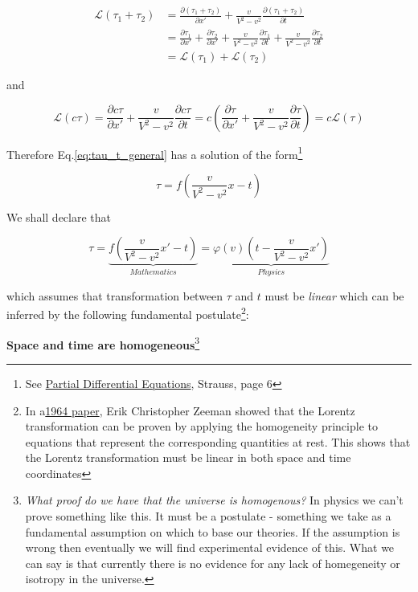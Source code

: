 \begin{align}
    \mathscr{L}(\tau_1 + \tau_2) &= \frac{\partial(\tau_1 + \tau_2)}{\partial x'} + \frac{v}{V^2 - v^2}\frac{\partial(\tau_1 + \tau_2)}{\partial t} \\
    &= \frac{\partial\tau_1}{\partial x'} + \frac{\partial\tau_2}{\partial x'} + \frac{v}{V^2 - v^2}\frac{\partial\tau_1}{\partial t} + \frac{v}{V^2 - v^2}\frac{\partial\tau_2}{\partial t} \\
    &= \mathscr{L}(\tau_1) + \mathscr{L}(\tau_2)
\end{align}

and

\begin{equation}
    \mathscr{L}(c\tau) = \frac{\partial c\tau}{\partial x'} + \frac{v}{V^2 - v^2}\frac{\partial c\tau}{\partial t} = c\left( \frac{\partial\tau}{\partial x'} + \frac{v}{V^2 - v^2}\frac{\partial\tau}{\partial t} \right) = c\mathscr{L}(\tau)
\end{equation}

Therefore Eq.\ref{eq:tau_t_general} has a solution of the form\footnote{See \href{https://trello.com/c/5L46ePJQ}{Partial Differential Equations}, Strauss, page 6}

\begin{equation}
    \tau = f\left( \frac{v}{V^2 - v^2} x - t \right)
\end{equation}

We shall declare that

\begin{equation}\label{eq:transformation}
\tau = \underbrace{f\left( \frac{v}{V^2 - v^2} x' - t \right)}_{Mathematics} = \underbrace{\varphi(v)\left( t - \frac{v}{V^2 - v^2} x' \right)}_{Physics}
\end{equation}

which assumes that transformation between $\tau$ and $t$ must be \textit{linear} which can be inferred by the
following fundamental postulate\footnote{In a\href{https://download.wpsoftware.net/causality-lorentz-group-zeeman.pdf}{1964 paper}, Erik Christopher Zeeman showed that the Lorentz transformation can be proven by applying the homogeneity principle to equations that represent the corresponding quantities at rest. This shows that the Lorentz transformation must be linear in both space and time coordinates}:

\begin{tcolorbox}[
    enhanced,frame hidden,boxrule=0pt,interior style={top color=green!10!white,
    bottom color=green!10!white,middle color=green!50!yellow},
    fuzzy halo=1pt with green
]
    \begin{center}
        \textbf{Space and time are homogeneous}\footnote{\textit{What proof do we have that the universe is
        homogenous?} In physics we can't prove something like this. It must be a postulate - something we take as a
        fundamental assumption on which to base our theories. If the assumption is wrong then eventually we will find
        experimental evidence of this. What we can say is that currently there is no evidence for any lack of
        homegeneity or isotropy in the universe.}
    \end{center}
\end{tcolorbox}

